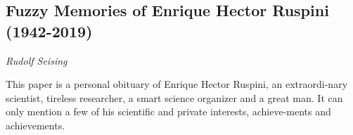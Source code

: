 \documentclass[../booklet.tex]{subfiles}
\begin{document}
\subsection[Fuzzy Memories of Enrique Hector Ruspini (1942-2019). {\it Rudolf Seising}]{Fuzzy Memories of Enrique Hector Ruspini (1942-2019)}

\begin{center}
  {\it Rudolf Seising}
\end{center}


This paper is a personal obituary of Enrique Hector Ruspini, an extraordi-nary scientist, tireless researcher, a smart science organizer and a great man. It can only mention a few of his scientific and private interests, achieve-ments and achievements.
\end{document}
